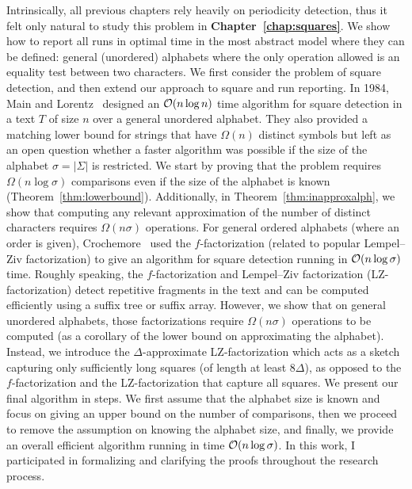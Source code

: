Intrinsically, all previous chapters rely heavily on periodicity detection, thus it felt only natural to study this problem in \textbf{Chapter~\ref{chap:squares}}. We show how to report all runs in optimal time in the most abstract model where they can be defined: general (unordered) alphabets where the only operation allowed is an equality test between two characters. 
We first consider the problem of square detection, and then extend our approach to square and run reporting.
In 1984, Main and Lorentz~\cite{Main1984} designed an $\mathcal{O}(n\log n)$ time algorithm for square detection in a text $T$ of size $n$ over a general unordered alphabet. They also provided a matching lower bound for strings that have $\Omega(n)$ distinct symbols but left as an open question whether a faster algorithm was possible if the size of the alphabet $\sigma=|\Sigma|$ is restricted.
We start by proving that the problem requires $\Omega(n \log \sigma)$ comparisons even if the size of the alphabet is known (Theorem~\ref{thm:lowerbound}). Additionally, in Theorem~\ref{thm:inapproxalph}, we show that computing any relevant approximation of the number of distinct characters requires $\Omega(n\sigma)$ operations.
For general ordered alphabets (where an order is given), Crochemore~\cite{Crochemore1986} used the $f$-factorization (related to popular Lempel--Ziv factorization) to give an algorithm for square detection running in $\mathcal{O}(n\log \sigma)$ time. Roughly speaking, the $f$-factorization and Lempel--Ziv factorization (LZ-factorization) detect repetitive fragments in the text and can be computed efficiently using a suffix tree or suffix array. However, we show that on general unordered alphabets, those factorizations require $\Omega(n\sigma)$ operations to be computed (as a corollary of the lower bound on approximating the alphabet). %
Instead, we introduce the $\Delta$-approximate LZ-factorization which acts as a sketch capturing only sufficiently long squares (of length at least $8\Delta$), as opposed to the $f$-factorization and the LZ-factorization that capture all squares.
We present our final algorithm in steps. We first assume that the alphabet size is known and focus on giving an upper bound on the number of comparisons, then we proceed to remove the assumption on knowing the alphabet size, and finally, we provide an overall efficient algorithm running in time $\mathcal{O}(n\log\sigma)$.
In this work, I participated in formalizing and clarifying the proofs throughout the research process.

